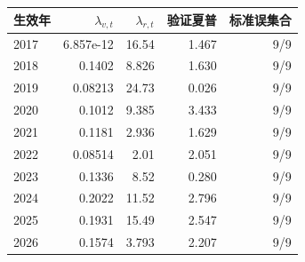 \begin{tabular}{lrrrr}
\toprule
生效年 & $\lambda_{v,t}$ & $\lambda_{r,t}$ & 验证夏普 & 标准误集合\\\midrule
2017 & 6.857e-12 & 16.54 & 1.467 & 9/9\\
2018 & 0.1402 & 8.826 & 1.630 & 9/9\\
2019 & 0.08213 & 24.73 & 0.026 & 9/9\\
2020 & 0.1012 & 9.385 & 3.433 & 9/9\\
2021 & 0.1181 & 2.936 & 1.629 & 9/9\\
2022 & 0.08514 & 2.01 & 2.051 & 9/9\\
2023 & 0.1336 & 8.52 & 0.280 & 9/9\\
2024 & 0.2022 & 11.52 & 2.796 & 9/9\\
2025 & 0.1931 & 15.49 & 2.547 & 9/9\\
2026 & 0.1574 & 3.793 & 2.207 & 9/9\\
\bottomrule
\end{tabular}